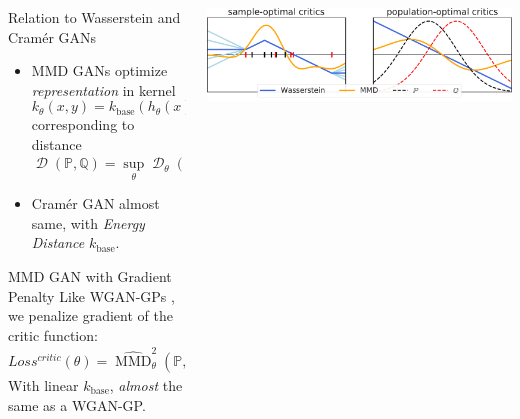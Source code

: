 \documentclass[xcolor={table}]{beamer}
\DeclareMathOperator{\D}{\mathcal{D}}
\DeclareMathOperator*{\E}{\mathbb{E}}
\newcommand{\PP}{\mathbb P}
\newcommand{\QQ}{\mathbb Q}
\newcommand{\ZZ}{\mathbb Z}
\DeclareMathOperator{\mmd}{MMD}
\begin{document}
\begin{frame}{}
\begin{columns}[T, totalwidth=\textwidth]
\begin{column}{.32\textwidth}
\begin{block}{Relation to Wasserstein and Cram\'er GANs}
\begin{itemize}
{          %
        }
        \item
          MMD GANs \parencite{mmd-gan} optimize \emph{representation} in kernel
          \[ k_{\theta}(x, y) = k_\mathrm{base}(h_{\theta}(x), h_{\theta}(y)), \]
          corresponding to distance
          \[ \D(\PP, \QQ) = {\sup}_\theta \D_\theta(\PP, \QQ) = {\sup}_{\theta} \mmd_{k_\theta}^2(\PP, \QQ). \]
        \item Cram\'er GAN \parencite{cramer-gan} almost same, with \emph{Energy Distance} $k_\mathrm{base}$.
      \end{itemize}
    \end{block}

    \begin{block}{MMD GAN with Gradient Penalty}
      Like WGAN-GPs \parencite{wgan-gp}, we penalize
      gradient of the critic function:
      \[ Loss^{critic}(\theta) = \widehat{\mmd}_{\theta}^2(\PP, \QQ_{\psi}) + \lambda\E_{\tilde{X}}\left(\|\nabla_{\tilde{X}} f^*(\tilde{X})\| - 1\right)^2. \]
      With linear $k_\mathrm{base}$,
      \emph{almost} the same as a WGAN-GP.
    \end{block}
  \end{column}

  \begin{column}{.32\textwidth}
      \includegraphics[width=\linewidth]{figs/witness.pdf}


\end{column}
\end{columns}
\end{frame}
\end{document}
